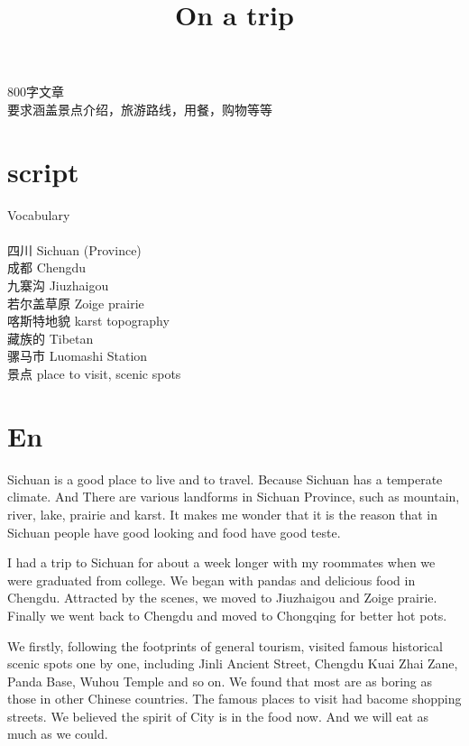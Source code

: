 \documentclass[UTF8]{article}
\title{On a trip}
\begin{document}
\maketitle

800字文章 \\
要求涵盖景点介绍，旅游路线，用餐，购物等等

\section{script}

Vocabulary \\ 
\\
四川	Sichuan (Province) \\
成都	Chengdu \\
九寨沟  Jiuzhaigou \\
若尔盖草原 Zoige prairie \\
喀斯特地貌 karst topography \\
藏族的 Tibetan \\
骡马市 Luomashi Station \\
景点 place to visit, scenic spots\\

\section{En}

Sichuan is a good place to live and to travel. Because Sichuan has a temperate climate.
And There are various landforms in Sichuan Province, such as mountain,  river, lake, prairie and karst.
It makes me wonder that it is the reason that in Sichuan people have good looking and food have good teste.

I had a trip to Sichuan for about a week longer with my roommates when we were graduated from college.
We began with pandas and delicious food in Chengdu. Attracted by the scenes, we moved to  Jiuzhaigou and Zoige prairie. Finally we went back to Chengdu and moved to Chongqing for better hot pots.

We firstly, following the footprints of general tourism, visited famous historical scenic spots one by one, including Jinli Ancient Street, Chengdu Kuai Zhai Zane, Panda Base, Wuhou Temple and so on. We found that most are as boring as those in other Chinese countries. The famous places to visit had bacome shopping streets. We believed the spirit of City is in the food now. And we will eat as much as we could.
\end{document}
